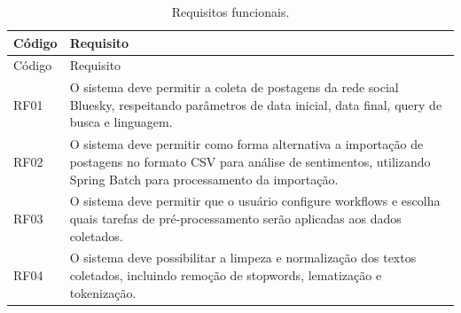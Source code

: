 \documentclass[
	12pt,				%
	oneside,			%
	a4paper,			%
	english,			%
	french,				%
	spanish,			%
	brazil				%
	]{abntex2}
\def\toprule{\hlineB{3}} %
\def\midrule{\hline}
\begin{document}
\begin{longtable}[]{@{}ll@{}}
\caption{Requisitos funcionais. \label{requisitos_funcionais}}\tabularnewline
\toprule
\begin{minipage}[b]{0.06\columnwidth}\raggedright
Código\strut
\end{minipage} & \begin{minipage}[b]{0.88\columnwidth}\raggedright
Requisito\strut
\end{minipage}\tabularnewline
\midrule
\endfirsthead
\toprule
\begin{minipage}[b]{0.06\columnwidth}\raggedright
Código\strut
\end{minipage} & \begin{minipage}[b]{0.88\columnwidth}\raggedright
Requisito\strut
\end{minipage}\tabularnewline
\midrule
\endhead
\begin{minipage}[t]{0.06\columnwidth}\raggedright
RF01\strut
\end{minipage} & \begin{minipage}[t]{0.88\columnwidth}\raggedright
O sistema deve permitir a coleta de postagens da rede social Bluesky, respeitando parâmetros de data inicial, data final, query de busca e linguagem.\strut
\end{minipage}\tabularnewline
\begin{minipage}[t]{0.06\columnwidth}\raggedright
RF02\strut
\end{minipage} & \begin{minipage}[t]{0.88\columnwidth}\raggedright
O sistema deve permitir como forma alternativa a importação de postagens no formato CSV para análise de sentimentos, utilizando Spring Batch para processamento da importação.\strut
\end{minipage}\tabularnewline
\begin{minipage}[t]{0.06\columnwidth}\raggedright
RF03\strut
\end{minipage} & \begin{minipage}[t]{0.88\columnwidth}\raggedright
O sistema deve permitir que o usuário configure workflows e escolha quais tarefas de pré-processamento serão aplicadas aos dados coletados.\strut
\end{minipage}\tabularnewline
\begin{minipage}[t]{0.06\columnwidth}\raggedright
RF04\strut
\end{minipage} & \begin{minipage}[t]{0.88\columnwidth}\raggedright
O sistema deve possibilitar a limpeza e normalização dos textos coletados, incluindo remoção de stopwords, lematização e tokenização.\strut

\end{minipage}
\end{longtable}
\end{document}

